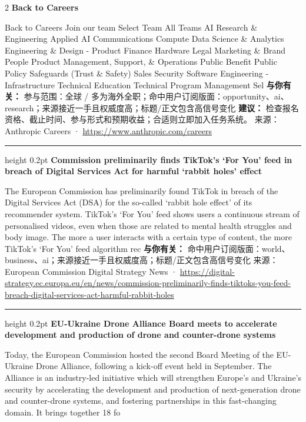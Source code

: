 \documentclass[10.5pt]{ctexart}
\begin{document}
\begin{multicols}{2}
{\large\bfseries Back to Careers}\par
Back to Careers Join our team Select Team All Teams AI Research \& Engineering Applied AI Communications Compute Data Science \& Analytics Engineering \& Design - Product Finance Hardware Legal Marketing \& Brand People Product Management, Support, \& Operations Public Benefit Public Policy Safeguards (Trust \& Safety) Sales Security Software Engineering - Infrastructure Technical Education Technical Program Management Sel
\textbf{与你有关：} 参与范围：全球 / 多为海外全职；命中用户订阅版面：opportunity、ai、research；来源接近一手且权威度高；标题/正文包含高信号变化
\textbf{建议：} 检查报名资格、截止时间、参与形式和预期收益；合适则立即加入任务系统。
{\footnotesize\color{ormuted} 来源：Anthropic Careers · \url{https://www.anthropic.com/careers}}
\vspace{2mm}
\hrule height 0.2pt
\vspace{2mm}
{\large\bfseries Commission preliminarily finds TikTok’s ‘For You’ feed in breach of Digital Services Act for harmful ‘rabbit holes’ effect}\par
The European Commission has preliminarily found TikTok in breach of the Digital Services Act (DSA) for the so-called ‘rabbit hole effect’ of its recommender system. TikTok's ‘For You' feed shows users a continuous stream of personalised videos, even when those are related to mental health struggles and body image. The more a user interacts with a certain type of content, the more TikTok's ‘For You' feed algorithm rec
\textbf{与你有关：} 命中用户订阅版面：world、business、ai；来源接近一手且权威度高；标题/正文包含高信号变化
{\footnotesize\color{ormuted} 来源：European Commission Digital Strategy News · \url{https://digital-strategy.ec.europa.eu/en/news/commission-preliminarily-finds-tiktoks-you-feed-breach-digital-services-act-harmful-rabbit-holes}}
\vspace{2mm}
\hrule height 0.2pt
\vspace{2mm}
{\large\bfseries EU-Ukraine Drone Alliance Board meets to accelerate development and production of drone and counter-drone systems}\par
Today, the European Commission hosted the second Board Meeting of the EU-Ukraine Drone Alliance, following a kick-off event held in September. The Alliance is an industry-led initiative which will strengthen Europe's and Ukraine's security by accelerating the development and production of next-generation drone and counter-drone systems, and fostering partnerships in this fast-changing domain. It brings together 18 fo

\end{multicols}
\end{document}
